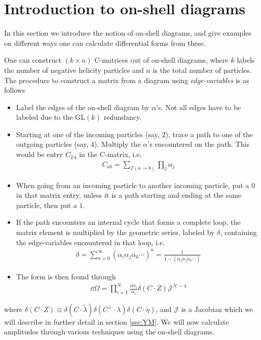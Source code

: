 \documentclass[letter,11pt]{article}
\begin{document}
\section{Introduction to on-shell diagrams}\label{sec:on-she-intro}
In this section we introduce the notion of on-shell diagrams, and give examples on different ways one can calculate differential forms from these. 

One can construct $(k\times n)$ C-matrices out of on-shell diagrams, where $k$ labels the number of negative helicity particles and $n$ is the total number of particles. The procedure to construct a matrix from a diagram using \textit{edge-variables} is as follows
\begin{itemize}
	\item Label the edges of the on-shell diagram by $\alpha$'s. Not all edges have to be labeled due to the GL$(k)$ redundancy.
	\item Starting at one of the incoming particles (say, $2$), trace a path to one of the outgoing particles  (say, $4$). Multiply the $\alpha$'s encountered on the path. This would be entry $C_{2\,4}$ in the C-matrix, i.e.
	\begin{equation}
		\begin{aligned}
			C_{ab}=\sum_{\Gamma(a\to b)}\prod_j\alpha_j
		\end{aligned}
	\end{equation}
	\item When going from an incoming particle to another incoming particle, put a $0$ in that matrix entry, unless it is a path starting and ending at the same particle, then put a $1$.
	\item If the path encounters an internal cycle that forms a complete loop, the matrix element is multiplied by the geometric series, labeled by $\delta$, containing the edge-variables encountered in that loop, i.e.
	\begin{equation}
		\begin{aligned}
			\delta=\sum_{n=0}^\infty (\alpha_i \alpha_j\alpha_k \cdots)^n=\frac{1}{1- (\alpha_i \alpha_j\alpha_k \cdots)}
		\end{aligned}
	\end{equation}
	\item The form is then found through
	\begin{equation}
		\begin{aligned}
			\dd \Omega =\prod_{i=1}^{N}\frac{\dd \alpha_i}{\alpha_i}\delta(C\cdot Z)\mathcal{J}^{\mathcal{N}-4}
		\end{aligned}
	\end{equation}
\end{itemize} 
where $\delta(C\cdot Z)\equiv\delta(C\cdot \tilde \lambda) \delta(C^\perp\cdot \lambda)\delta(C\cdot \tilde \eta)$, and $\mathcal{J}$ is a Jacobian which we will describe in further detail in section \ref{sec:YM}.
We will now calculate amplitudes through various techniques using the on-shell diagrams. 
\end{document}
